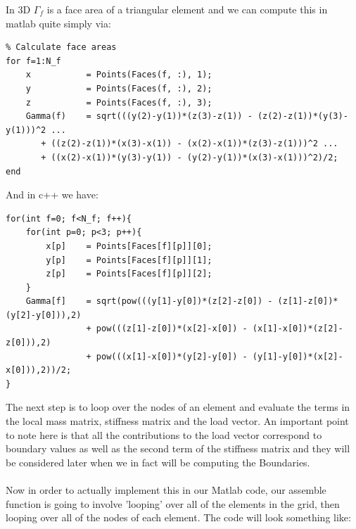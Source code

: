 \documentclass[12pt]{article}
\begin{document}
In 3D $\Gamma_f$ is a face area of a triangular element and we can compute this in matlab quite simply via:

\begin{lstlisting}
% Calculate face areas
for f=1:N_f	
	x           = Points(Faces(f, :), 1);
	y           = Points(Faces(f, :), 2);
	z           = Points(Faces(f, :), 3);
	Gamma(f)	= sqrt(((y(2)-y(1))*(z(3)-z(1)) - (z(2)-z(1))*(y(3)-y(1)))^2 ... 
	   + ((z(2)-z(1))*(x(3)-x(1)) - (x(2)-x(1))*(z(3)-z(1)))^2 ...
	   + ((x(2)-x(1))*(y(3)-y(1)) - (y(2)-y(1))*(x(3)-x(1)))^2)/2;
end
\end{lstlisting}

And in c++ we have:

\begin{lstlisting}[style=MyC++Style]
for(int f=0; f<N_f; f++){
	for(int p=0; p<3; p++){
		x[p]	= Points[Faces[f][p]][0];
		y[p]	= Points[Faces[f][p]][1];
		z[p]	= Points[Faces[f][p]][2];
	}
	Gamma[f]	= sqrt(pow(((y[1]-y[0])*(z[2]-z[0]) - (z[1]-z[0])*(y[2]-y[0])),2)
				+ pow(((z[1]-z[0])*(x[2]-x[0]) - (x[1]-x[0])*(z[2]-z[0])),2)
				+ pow(((x[1]-x[0])*(y[2]-y[0]) - (y[1]-y[0])*(x[2]-x[0])),2))/2;
}
\end{lstlisting}

The next step is to loop over the nodes of an element and evaluate the terms in the local mass matrix, stiffness matrix and the load vector. An important point to note here is that all the contributions to the load vector correspond to boundary values as well as the second term of the stiffness matrix and they will be considered later when we in fact will be computing the Boundaries. \cite{Steve13}
\\\\
Now in order to actually implement this in our Matlab code, our assemble function is going to involve 'looping' over all of
the elements in the grid, then looping over all of the nodes of each element. The code will look something like:
\end{document}
